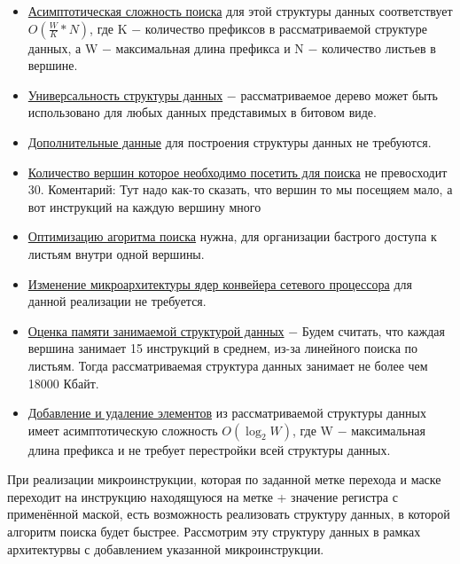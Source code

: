 \documentclass[a4peper, 12pt, titlepage, finall]{report}
\begin{document}
            \begin{itemize}
                \item\underline{Асимптотическая сложность поиска} для этой структуры данных соответствует {\ttfamily $O(\frac{W}{K}*N)$},
                где {\ttfamily K} $-$ количество префиксов в рассматриваемой структуре данных, а {\ttfamily W} $-$ максимальная длина префикса
                и {\ttfamily N} $-$ количество листьев в вершине.
                \item\underline{Универсальность структуры данных} $-$ рассматриваемое дерево может быть использовано для любых данных представимых в битовом виде.
                \item\underline{Дополнительные данные} для построения структуры данных не требуются.
                \item\underline{Количество вершин которое необходимо посетить для поиска} не превосходит 30. 
                {\ttfamily Коментарий: Тут надо как-то сказать, что вершин то мы посещяем мало, а вот инструкций на каждую вершину много}
                \item\underline{Оптимизацию агоритма поиска} нужна, для организации бастрого доступа к листьям внутри одной вершины. 
                \item\underline{Изменение микроархитектуры ядер конвейера сетевого процессора} для данной реализации не требуется.
                \item\underline{Оценка памяти занимаемой структурой данных} $-$ Будем считать, что каждая вершина занимает 15 инструкций в среднем, из-за линейного поиска по листьям. 
                Тогда рассматриваемая структура данных занимает не более чем 18000 Кбайт.
                \item\underline{Добавление и удаление элементов} из рассматриваемой структуры данных имеет асимптотическую сложность 
                {\ttfamily $O(\log_2{W})$}, где {\ttfamily W} $-$ максимальная длина префикса и не требует перестройки всей структуры данных.\\
            \end{itemize}
            При реализации микроинструкции, которая по заданной метке перехода и маске переходит на инструкцию находящуюся на метке + значение регистра с применённой маской,
            есть возможность реализовать структуру данных, в которой алгоритм поиска будет быстрее. Рассмотрим эту структуру данных в рамках архитектурвы с добавлением указанной микроинструкции.\\
\end{document}
